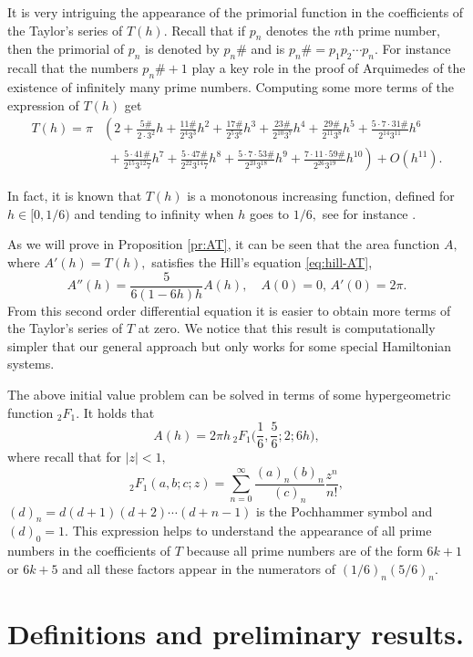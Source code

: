 \documentclass[12pt,a4paper,reqno]{amsart}
\begin{document}
It is very intriguing the appearance of the primorial function in
the coefficients of the Taylor's series of $T(h).$ Recall that if
$p_n$ denotes the $n$th prime number, then the primorial of $p_n$ is
denoted by $p_n\#$ and is $p_n\#=p_1p_2\cdots p_n.$ For instance
recall that the numbers $p_n\#+1$ play a key role in the proof of
Arquimedes of the existence of infinitely many prime numbers.
Computing some more terms of the expression of $T(h)$ get
\begin{align*}
T(h)=\pi&\left(2+\frac{5\#}{2\cdot 3^2}h+\frac{
11\#}{2^{4}3^{3}}h^2+\frac{17\#}{2^{5}3^{6}}h^3+\frac{
23\#}{2^{10}3^{7}}h^4+\frac{29\#}{2^{11}3^{8}}h^5
+\frac{5\cdot7\cdot31\#}{2^{14}3^{11}}h^6\right.
\\ &\left.\,\,+\frac{5\cdot 41\#}{2^{15}3^{12}7}h^7
+\frac{5\cdot 47\#}{2^{22}3^{14}7}h^8+ \frac{5\cdot 7\cdot
53\#}{2^{23}3^{18}}h^9 +\frac{7\cdot 11\cdot
59\#}{2^{26}3^{19}}h^{10}\right)+O(h^{11}).
\end{align*}

In fact, it is known that $T(h)$ is a monotonous increasing
function, defined for $h\in[0,1/6)$ and tending to infinity when $h$
goes to $1/6,$ see for instance \cite{FreGasGui2004}.

As we will prove in Proposition \ref{pr:AT}, it can be seen that the
area function $A,$ where $A'(h)=T(h),$ satisfies the Hill's equation
\eqref{eq:hill-AT},
\[
A''(h)=\frac5{6(1-6h)h}A(h), \quad  A(0)=0,\, A'(0)=2\pi.
\]
From this second order differential equation it is easier to obtain
more terms of the Taylor's series of $T$ at zero. We notice that
this result is computationally simpler that our general approach but
only works for some special Hamiltonian systems.

The above initial value problem can be solved in terms of some
hypergeometric function $_2 F_1.$ It holds that
\[
A(h)=2\pi h\, _2F_1\Big(\frac16,\frac56;2; 6h\Big),
\]
where recall that for $|z|<1,$
\[
_2F_1(a,b;c;z)=\sum_{n=0}^\infty \frac{(a)_n(b)_n}{(c)_n} \frac
{z^n}{n!},
\]
$(d)_n=d(d+1)(d+2)\cdots(d+n-1)$ is the Pochhammer symbol and
$(d)_0=1.$ This expression helps to understand the appearance of all
prime numbers in the coefficients of $T$ because all  prime numbers
are of the form $6k+1$ or $6k+5$ and all these factors appear in the
numerators of $(1/6)_n(5/6)_n.$


    \section{Definitions and preliminary results.} \label{sec:2}
\end{document}

